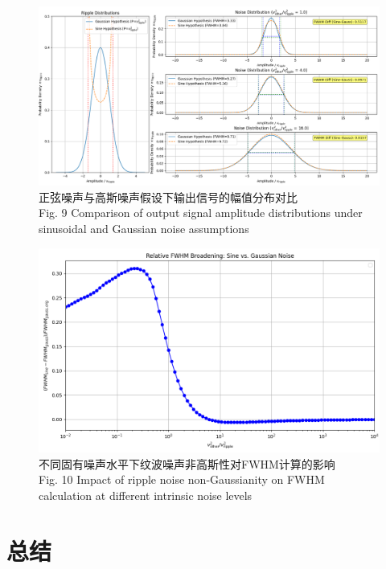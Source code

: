 \documentclass{ctexart}
\begin{document}
\begin{figure}[!h]
    \centering
    \includegraphics[width=\linewidth]{./non_gausian_effect.png}
    \caption{正弦噪声与高斯噪声假设下输出信号的幅值分布对比 \\ Fig. 9 Comparison of output signal amplitude distributions under sinusoidal and Gaussian noise assumptions}
    \label{fig:non_gausian_effect}
\end{figure}

\begin{figure}[!h]
    \centering
    \includegraphics[width=\linewidth]{./non_gausian_effect_num.png}
    \caption{不同固有噪声水平下纹波噪声非高斯性对FWHM计算的影响 \\ Fig. 10 Impact of ripple noise non-Gaussianity on FWHM calculation at different intrinsic noise levels}
    \label{fig:non_gausian_effect_num}
\end{figure}


\section{总结}
\end{document}
